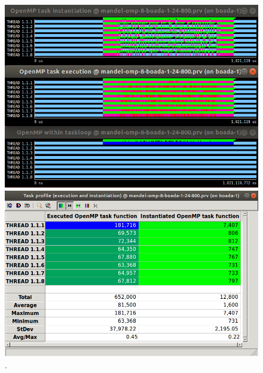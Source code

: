 \documentclass[12pt, a4paper]{article}
\begin{document}
\begin{figure}[H]
\begin{minipage}[t]{0.4\linewidth}
  \centering
  \includegraphics[scale=0.35]{./S2_OMP_tasks_24_800}
  \caption{.}
  \label{fig:S2_OMP_tasks_24_800}
\end{minipage}%
\hspace{1.45cm}
\begin{minipage}[t]{0.4\linewidth}
  \centering
  \includegraphics[scale=0.3]{./S2_OMP_tasks_24_800_table}
  \caption{.}
  \label{fig:S2_OMP_tasks_24_800_table}
\end{minipage}
\end{figure}




\end{document}
